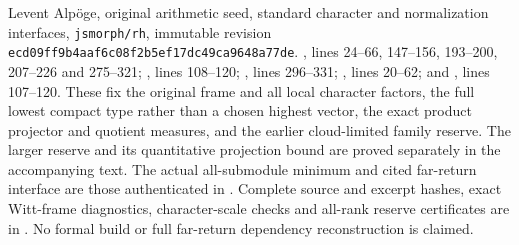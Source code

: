 Levent Alp\"oge, original arithmetic seed, standard character and
normalization interfaces, \texttt{jsmorph/rh}, immutable revision
\texttt{ecd09ff9b4aaf6c08f2b5ef17dc49ca9648a77de}.
,
lines 24--66, 147--156, 193--200, 207--226 and 275--321;
, lines 108--120;
, lines 296--331;
, lines 20--62;
and ,
lines 107--120.
These fix the original frame and all local character factors,
the full lowest compact type rather than a chosen highest vector,
the exact product projector and quotient measures, and the earlier
cloud-limited family reserve.  The larger reserve and its quantitative
projection bound are proved separately in the accompanying text.
The actual all-submodule minimum and cited far-return interface are
those authenticated in
.
Complete source and excerpt hashes, exact Witt-frame diagnostics,
character-scale checks and all-rank reserve certificates are in
.
No formal build or full far-return dependency reconstruction is claimed.
